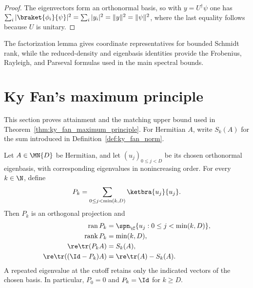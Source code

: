\begin{proof}
    \leanok
    The eigenvectors form an orthonormal basis, so with $y=U^\dagger\psi$ one
    has
    $\sum_i|\braket{\phi_i}{\psi}|^2=\sum_i|y_i|^2=\|y\|^2=\|\psi\|^2$,
    where the last equality follows because $U$ is unitary.
\end{proof}

The factorization lemma gives coordinate representatives for bounded Schmidt
rank, while the reduced-density and eigenbasis identities provide the
Frobenius, Rayleigh, and Parseval formulas used in the main spectral bounds.

\section{Ky Fan's maximum principle}
\label{sec:app_positive_not_cp_ky_fan}

This section proves attainment and the matching upper bound used in
Theorem~\ref{thm:ky_fan_maximum_principle}. For Hermitian $A$, write $S_k(A)$
for the sum introduced in Definition~\ref{def:ky_fan_norm}.

\begin{theorem}
    \label{thm:leading_eigenprojection}
    \leanok
    Let $A\in\MN{D}$ be Hermitian, and let $(u_j)_{0\le j<D}$ be its chosen
    orthonormal eigenbasis, with corresponding eigenvalues in nonincreasing
    order. For every $k\in\N$, define
    \begin{align}
        P_k=\sum_{0\le j<\min(k,D)}\ketbra{u_j}{u_j}.\notag
    \end{align}
    Then $P_k$ is an orthogonal projection and
    \begin{align}
        \operatorname{ran}P_k
                               & =\spn_{\C}\{u_j:0\le j<\min(k,D)\},\notag \\
        \operatorname{rank}P_k & =\min(k,D),\notag                         \\
        \re\tr(P_kA)           & =S_k(A),\notag                            \\
        \re\tr((\Id-P_k)A)     & =\re\tr(A)-S_k(A).\notag
    \end{align}
    A repeated eigenvalue at the cutoff retains only the indicated vectors
    of the chosen basis. In particular, $P_0=0$ and $P_k=\Id$ for $k\ge D$.
\end{theorem}

